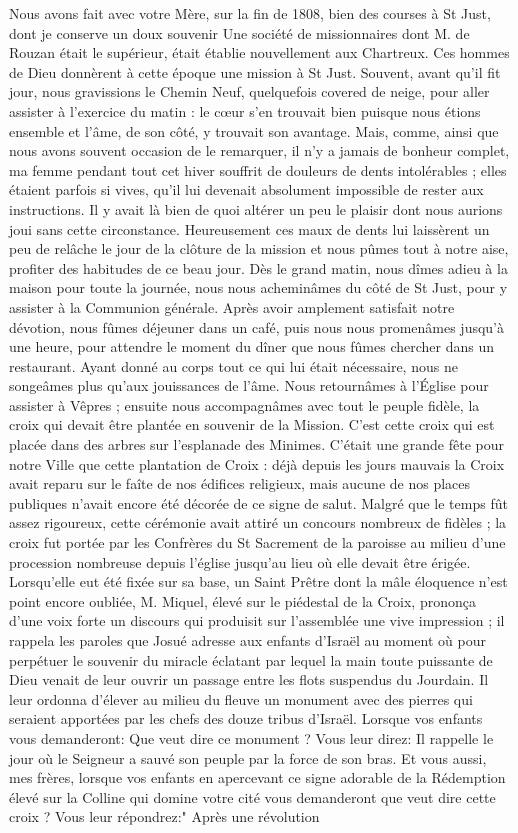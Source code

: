 \documentclass[11pt,a4paper]{report}
\begin{document}
Nous avons fait avec votre Mère, sur la fin de 1808, bien des courses à St Just, dont je conserve un doux souvenir Une société de missionnaires dont M. de Rouzan était le supérieur, était établie nouvellement aux Chartreux. Ces hommes de Dieu donnèrent à cette époque une mission à St Just. Souvent, avant qu'il fit jour, nous gravissions le Chemin Neuf, quelquefois covered de neige, pour aller assister à l'exercice du matin : le cœur s'en trouvait bien puisque nous étions ensemble et l'âme, de son côté, y trouvait son avantage. Mais, comme, ainsi que nous avons souvent occasion de le remarquer, il n'y a jamais de bonheur complet, ma femme pendant tout cet hiver souffrit de douleurs de dents intolérables ; elles étaient parfois si vives, qu'il lui devenait absolument impossible de rester aux instructions. Il y avait là bien de quoi altérer un peu le plaisir dont nous aurions joui sans cette circonstance. Heureusement ces maux de dents lui laissèrent un peu de relâche le jour de la clôture de la mission et nous pûmes tout à notre aise, profiter des habitudes de ce beau jour. Dès le grand matin, nous dîmes adieu à la maison pour toute la journée, nous nous acheminâmes du côté de St Just, pour y assister à la Communion générale. Après avoir amplement satisfait notre dévotion, nous fûmes déjeuner dans un café, puis nous nous promenâmes jusqu'à une heure, pour attendre le moment du dîner que nous fûmes chercher dans un restaurant. Ayant donné au corps tout ce qui lui était nécessaire, nous ne songeâmes plus qu'aux jouissances de l'âme. Nous retournâmes à l'Église pour assister à Vêpres ; ensuite nous accompagnâmes avec tout le peuple fidèle, la croix qui devait être plantée en souvenir de la Mission. C'est cette croix qui est placée dans des arbres sur l'esplanade des Minimes. C'était une grande fête pour notre Ville que cette plantation de Croix : déjà depuis les jours mauvais la Croix avait reparu sur le faîte de nos édifices religieux, mais aucune de nos places publiques n'avait encore été décorée de ce signe de salut. Malgré que le temps fût assez rigoureux, cette cérémonie avait attiré un concours nombreux de fidèles ; la croix fut portée par les Confrères du St Sacrement de la paroisse au milieu d'une procession nombreuse depuis l'église jusqu'au lieu où elle devait être érigée. Lorsqu'elle eut été fixée sur sa base, un Saint Prêtre dont la mâle éloquence n'est point encore oubliée, M. Miquel, élevé sur le piédestal de la Croix, prononça d'une voix forte un discours qui produisit sur l'assemblée une vive impression ; il rappela les paroles que Josué adresse aux enfants d'Israël au moment où pour perpétuer le souvenir du miracle éclatant par lequel la main toute puissante de Dieu venait de leur ouvrir un passage entre les flots suspendus du Jourdain. Il leur ordonna d'élever au milieu du fleuve un monument avec des pierres qui seraient apportées par les chefs des douze tribus d'Israël. Lorsque vos enfants vous demanderont: Que veut dire ce monument ? Vous leur direz: Il rappelle le jour où le Seigneur a sauvé son peuple par la force de son bras. Et vous aussi, mes frères, lorsque vos enfants en apercevant ce signe adorable de la Rédemption élevé sur la Colline qui domine votre cité vous demanderont que veut dire cette croix ? Vous leur répondrez:" Après une révolution 
\end{document}
